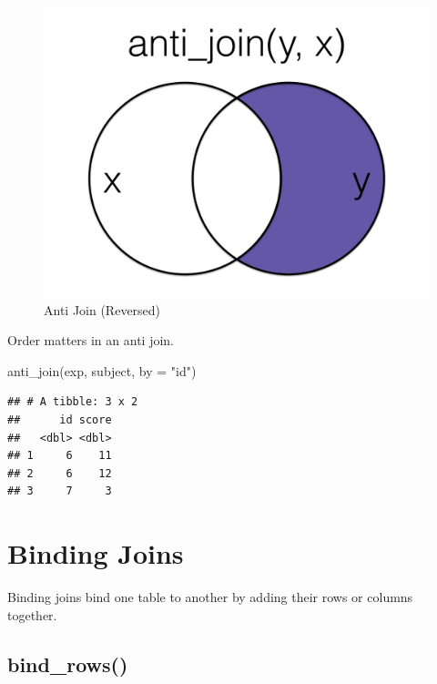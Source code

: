 \documentclass[
  oneside]{book}
\newenvironment{Shaded}{\begin{snugshade}}{\end{snugshade}}
\newcommand{\AttributeTok}[1]{\textcolor[rgb]{0.77,0.63,0.00}{#1}}
\newcommand{\FunctionTok}[1]{\textcolor[rgb]{0.00,0.00,0.00}{#1}}
\newcommand{\NormalTok}[1]{#1}
\newcommand{\StringTok}[1]{\textcolor[rgb]{0.31,0.60,0.02}{#1}}
\begin{document}
\begin{figure}

{\centering \includegraphics[width=1\linewidth]{images/joins/anti_join_rev} 

}

\caption{Anti Join (Reversed)}\label{fig:img-anti-join-rev}
\end{figure}

Order matters in an anti join.

\begin{Shaded}
\begin{Highlighting}[]
\FunctionTok{anti\_join}\NormalTok{(exp, subject, }\AttributeTok{by =} \StringTok{"id"}\NormalTok{)}
\end{Highlighting}
\end{Shaded}

\begin{verbatim}
## # A tibble: 3 x 2
##      id score
##   <dbl> <dbl>
## 1     6    11
## 2     6    12
## 3     7     3
\end{verbatim}

\hypertarget{binding-joins}{%
\section{Binding Joins}\label{binding-joins}}

Binding joins bind one table to another by adding their rows or columns together.

\hypertarget{bind_rows}{%
\subsection{bind\_rows()}\label{bind_rows}}
\end{document}
